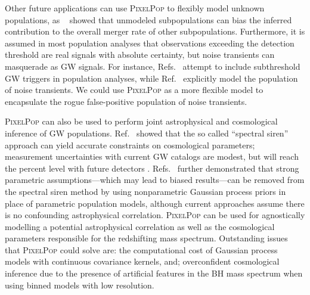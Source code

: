 \documentclass[%
reprint,
 amsmath,amssymb,
 aps,
 prd,nofootinbib,nobibnotes,
 superscriptaddress,groupedaddress,
]{revtex4-2}
\begin{document}
Other future applications can use \textsc{PixelPop} to flexibly model unknown populations, as \citeauthor{Cheng:2023ddt}~\cite{Cheng:2023ddt} showed that unmodeled subpopulations can bias the inferred contribution to the overall merger rate of other subpopulations. Furthermore, it is assumed in most population analyses that observations exceeding the detection threshold are real signals with absolute certainty, but noise transients can masquerade as GW signals. For instance, Refs.~\cite{Gaebel:2018poe, Roulet:2020wyq, Galaudage:2019jdx} attempt to include subthreshold GW triggers in population analyses, while Ref.~\cite{Heinzel:2023vkq} explicitly model the population of noise transients. We could use \textsc{PixelPop} as a more flexible model to encapsulate the rogue false-positive population of noise transients.

\textsc{PixelPop} can also be used to perform joint astrophysical and cosmological inference of GW populations. Ref.~\cite{Ezquiaga:2022zkx} showed that the so called ``spectral siren'' approach can yield accurate constraints on cosmological parameters; measurement uncertainties with current GW catalogs are modest, but will reach the percent level with future detectors \cite{Chen:2024gdn}. Refs.~\cite{Farah:2024xub, MaganaHernandez:2024uty} further demonstrated that strong parametric assumptions---which may lead to biased results---can be removed from the spectral siren method by using nonparametric Gaussian process priors in place of parametric population models, although current approaches assume there is no confounding astrophysical correlation. \textsc{PixelPop} can be used for agnostically modelling a potential astrophysical correlation as well as the cosmological parameters responsible for the redshifting mass spectrum. Outstanding issues that \textsc{PixelPop} could solve are: the computational cost of Gaussian process models with continuous covariance kernels, and; overconfident cosmological inference due to the presence of artificial features in the BH mass spectrum when using binned models with low resolution.
\end{document}
